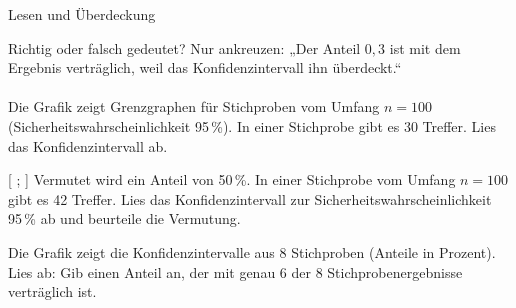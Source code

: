 \setcounter{aufgabe}{8}

\begin{aufgabe}{Lesen und Überdeckung}
\begin{teile}
\teil Richtig oder falsch gedeutet? Nur ankreuzen: „Der Anteil $0{,}3$ ist mit dem Ergebnis verträglich, weil das Konfidenzintervall ihn überdeckt.“ \\  \\ 
\teil Die Grafik zeigt Grenzgraphen für Stichproben vom Umfang $n = 100$ (Sicherheitswahrscheinlichkeit 95\,\%). In einer Stichprobe gibt es 30 Treffer. Lies das Konfidenzintervall ab.

\begin{ksys}[xmin=0,xmax=1,ymin=0,ymax=1,xstep=0.1,ystep=0.1,xlabel=p,ylabel=h,ablesen]   \end{ksys}
[ \leerfeld ; \leerfeld ]
\teil Vermutet wird ein Anteil von 50\,\%. In einer Stichprobe vom Umfang $n = 100$ gibt es 42 Treffer. Lies das Konfidenzintervall zur Sicherheitswahrscheinlichkeit 95\,\% ab und beurteile die Vermutung.

\begin{ksys}[xmin=0,xmax=1,ymin=0,ymax=1,xstep=0.1,ystep=0.1,xlabel=p,ylabel=h,ablesen]   \end{ksys}
\teil Die Grafik zeigt die Konfidenzintervalle aus 8 Stichproben (Anteile in Prozent). Lies ab: Gib einen Anteil an, der mit genau 6 der 8 Stichprobenergebnisse verträglich ist.


\end{teile}
\end{aufgabe}

